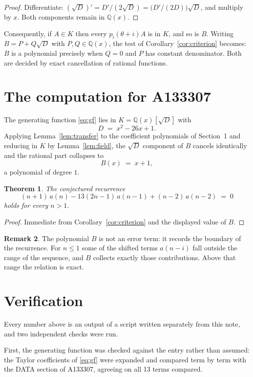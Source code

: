 \documentclass[11pt,a4paper]{article}
\theoremstyle{plain}
\newtheorem{theorem}{Theorem}
\theoremstyle{definition}
\newtheorem{remark}[theorem]{Remark}
\begin{document}
\begin{proof}
Differentiate: $(\sqrt{D})'=D'/(2\sqrt{D})=\bigl(D'/(2D)\bigr)\sqrt{D}$, and multiply by
$x$. Both components remain in $\mathbb{Q}(x)$.
\end{proof}

Consequently, if $A\in K$ then every $p_{i}(\theta+i)A$ is in $K$, and so is $B$. Writing
$B=P+Q\sqrt{D}$ with $P,Q\in\mathbb{Q}(x)$, the test of Corollary~\ref{cor:criterion}
becomes: $B$ is a polynomial precisely when $Q=0$ and $P$ has constant denominator. Both
are decided by exact cancellation of rational functions.

\section{The computation for A133307}

The generating function \eqref{eq:gf} lies in $K=\mathbb{Q}(x)[\sqrt{D}]$ with
\[
D \;=\; x^{2} - 26 x + 1 .
\]
Applying Lemma~\ref{lem:transfer} to the coefficient polynomials of Section~1 and reducing
in $K$ by Lemma~\ref{lem:field}, the $\sqrt{D}$ component of $B$ cancels identically and
the rational part collapses to
\[
B(x)\;=\;x + 1 ,
\]
a polynomial of degree $1$.

\begin{theorem}
The conjectured recurrence
\[
(n + 1)\,a(n) -  13 \left(2 n - 1\right)\,a(n-1) + (n - 2)\,a(n-2) \;=\;0
\]
holds for every $n>1$.
\end{theorem}

\begin{proof}
Immediate from Corollary~\ref{cor:criterion} and the displayed value of $B$.
\end{proof}

\begin{remark}
The polynomial $B$ is not an error term: it records the boundary of the recurrence. For
$n\le1$ some of the shifted terms $a(n-i)$ fall outside the range of the sequence,
and $B$ collects exactly those contributions. Above that range the relation is exact.
\end{remark}

\section{Verification}

Every number above is an output of a script written separately from this note, and two
independent checks were run.

First, the generating function was checked against the entry rather than assumed: the
Taylor coefficients of \eqref{eq:gf} were expanded and compared term by term with the DATA
section of A133307, agreeing on all 13 terms compared.
\end{document}
